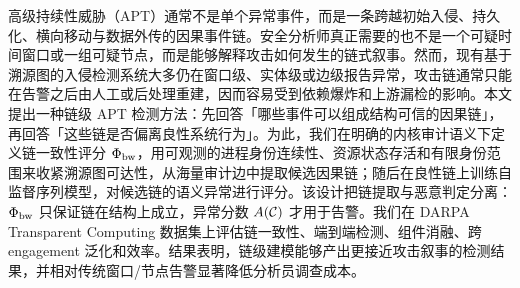 
高级持续性威胁（APT）通常不是单个异常事件，而是一条跨越初始入侵、持久化、横向移动与数据外传的因果事件链。安全分析师真正需要的也不是一个可疑时间窗口或一组可疑节点，而是能够解释攻击如何发生的链式叙事。然而，现有基于溯源图的入侵检测系统大多仍在窗口级、实体级或边级报告异常，攻击链通常只能在告警之后由人工或后处理重建，因而容易受到依赖爆炸和上游漏检的影响。本文提出一种链级 APT 检测方法：先回答「哪些事件可以组成结构可信的因果链」，再回答「这些链是否偏离良性系统行为」。为此，我们在明确的内核审计语义下定义链一致性评分 $\Phi_{\text{bw}}$，用可观测的进程身份连续性、资源状态存活和有限身份范围来收紧溯源图可达性，从海量审计边中提取候选因果链；随后在良性链上训练自监督序列模型，对候选链的语义异常进行评分。该设计把链提取与恶意判定分离：$\Phi_{\text{bw}}$ 只保证链在结构上成立，异常分数 $A(\mathcal{C})$ 才用于告警。我们在 DARPA Transparent Computing 数据集上评估链一致性、端到端检测、组件消融、跨 engagement 泛化和效率。结果表明，链级建模能够产出更接近攻击叙事的检测结果，并相对传统窗口/节点告警显著降低分析员调查成本。
